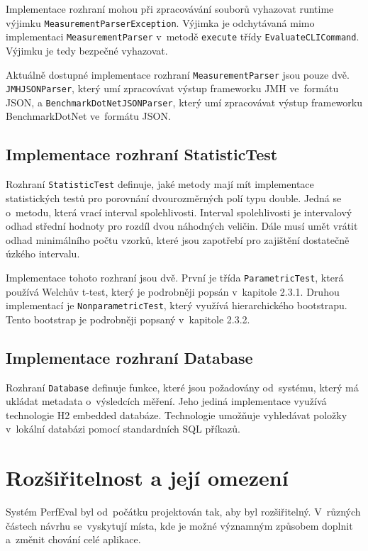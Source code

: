 Implementace rozhraní mohou při zpracovávání souborů vyhazovat runtime výjimku
\lstinline{MeasurementParserException}. Výjimka je odchytávaná mimo implementaci \lstinline{MeasurementParser}
v~metodě \lstinline{execute} třídy \lstinline{EvaluateCLICommand}. Výjimku je tedy bezpečné vyhazovat.

Aktuálně dostupné implementace rozhraní \lstinline{MeasurementParser} jsou pouze dvě.
\lstinline{JMHJSONParser}, který umí zpracovávat výstup frameworku JMH ve~formátu JSON, a \lstinline{BenchmarkDotNetJSONParser}, který
umí zpracovávat výstup frameworku BenchmarkDotNet ve~formátu JSON.

\subsection{Implementace rozhraní StatisticTest}

Rozhraní \lstinline{StatisticTest} definuje, jaké metody mají mít implementace statistických testů
pro porovnání dvourozměrných polí typu double. Jedná se o~metodu, která vrací interval spolehlivosti.
Interval spolehlivosti je intervalový odhad střední hodnoty pro rozdíl dvou náhodných veličin.
Dále musí umět vrátit odhad minimálního počtu vzorků, které jsou zapotřebí pro zajištění dostatečně úzkého intervalu.

Implementace tohoto rozhraní jsou dvě. První je třída \lstinline{ParametricTest}, která používá
Welchův t-test, který je podrobněji popsán v~kapitole 2.3.1. Druhou implementací je
\lstinline{NonparametricTest}, který využívá hierarchického bootstrapu. Tento bootstrap je podrobněji
popsaný v~kapitole 2.3.2.

\subsection{Implementace rozhraní Database}

Rozhraní \lstinline{Database} definuje funkce, které jsou požadovány od~systému, který má ukládat
metadata o~výsledcích měření. Jeho jediná implementace využívá technologie H2 embedded databáze.
Technologie umožňuje vyhledávat položky v~lokální databázi pomocí standardních SQL příkazů.

\section{Rozšiřitelnost a její omezení}

Systém PerfEval byl od~počátku projektován tak, aby byl rozšiřitelný.
V~různých částech návrhu se~vyskytují místa,
kde je možné významným způsobem doplnit a~změnit chování celé aplikace.

